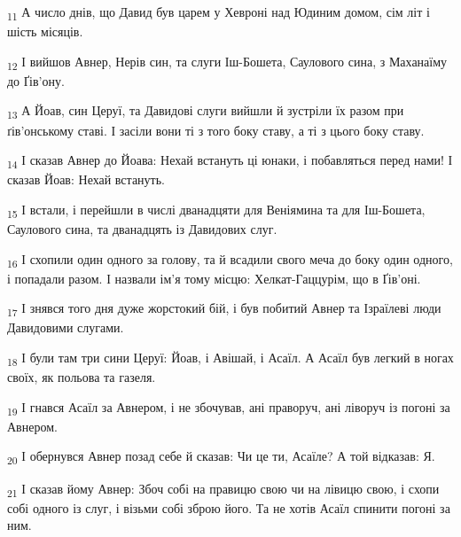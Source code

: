 \begin{tcolorbox}
\textsubscript{11} А число днів, що Давид був царем у Хевроні над Юдиним домом, сім літ і шість місяців.
\end{tcolorbox}
\begin{tcolorbox}
\textsubscript{12} І вийшов Авнер, Нерів син, та слуги Іш-Бошета, Саулового сина, з Маханаїму до Ґів'ону.
\end{tcolorbox}
\begin{tcolorbox}
\textsubscript{13} А Йоав, син Церуї, та Давидові слуги вийшли й зустріли їх разом при ґів'онському ставі. І засіли вони ті з того боку ставу, а ті з цього боку ставу.
\end{tcolorbox}
\begin{tcolorbox}
\textsubscript{14} І сказав Авнер до Йоава: Нехай встануть ці юнаки, і побавляться перед нами! І сказав Йоав: Нехай встануть.
\end{tcolorbox}
\begin{tcolorbox}
\textsubscript{15} І встали, і перейшли в числі дванадцяти для Веніямина та для Іш-Бошета, Саулового сина, та дванадцять із Давидових слуг.
\end{tcolorbox}
\begin{tcolorbox}
\textsubscript{16} І схопили один одного за голову, та й всадили свого меча до боку один одного, і попадали разом. І назвали ім'я тому місцю: Хелкат-Гаццурім, що в Ґів'оні.
\end{tcolorbox}
\begin{tcolorbox}
\textsubscript{17} І знявся того дня дуже жорстокий бій, і був побитий Авнер та Ізраїлеві люди Давидовими слугами.
\end{tcolorbox}
\begin{tcolorbox}
\textsubscript{18} І були там три сини Церуї: Йоав, і Авішай, і Асаїл. А Асаїл був легкий в ногах своїх, як польова та газеля.
\end{tcolorbox}
\begin{tcolorbox}
\textsubscript{19} І гнався Асаїл за Авнером, і не збочував, ані праворуч, ані ліворуч із погоні за Авнером.
\end{tcolorbox}
\begin{tcolorbox}
\textsubscript{20} І обернувся Авнер позад себе й сказав: Чи це ти, Асаїле? А той відказав: Я.
\end{tcolorbox}
\begin{tcolorbox}
\textsubscript{21} І сказав йому Авнер: Збоч собі на правицю свою чи на лівицю свою, і схопи собі одного із слуг, і візьми собі зброю його. Та не хотів Асаїл спинити погоні за ним.
\end{tcolorbox}
